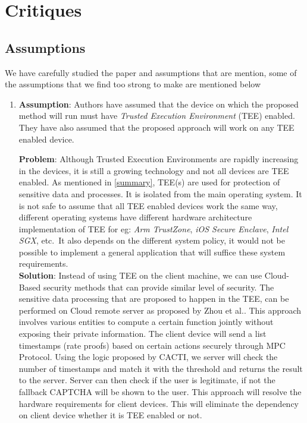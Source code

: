 \documentclass[runningheads,10pt]{llncs}
\begin{document}
	\section{Critiques}

	\subsection{Assumptions  \label{sec1}}

	We have carefully studied the paper and assumptions that are mention, some of the assumptions that we find too strong to make are mentioned below

	\begin{enumerate}
		\item \textbf{Assumption}: Authors have assumed that the device on which the proposed method will run must have \textit{Trusted Execution Environment} (TEE) enabled. They have also assumed that the proposed approach will work on any TEE enabled device.

		\textbf{Problem}: Although Trusted Execution Environments are rapidly increasing in the devices, it is still a growing technology and not all devices are TEE enabled. As mentioned in \ref{summary}, TEE(s) are used for protection of sensitive data and processes. It is isolated from the main operating system. It is not safe to assume that all TEE enabled devices work the same way, different operating systems have different hardware architecture implementation of TEE for eg: \textit{Arm TrustZone}, \textit{iOS Secure Enclave}, \textit{Intel SGX}, etc.\ It also depends on the different system policy, it would not be possible to implement a general application that will suffice these system requirements.\\

		\textbf{Solution}: Instead of using TEE on the client machine, we can use Cloud-Based security methods that can provide similar level of security. The sensitive data processing that are proposed to happen in the TEE, can be performed on Cloud remote server as proposed by Zhou et al.\cite{ref1}. This approach involves various entities to compute a certain function jointly without exposing their private information. The client device will send a list timestamps (rate proofs) based on certain actions securely through MPC Protocol. Using the logic proposed by CACTI, we server will check the number of timestamps and match it with the threshold and returns the result to the server. Server can then check if the user is legitimate, if not the fallback CAPTCHA will be shown to the user. This approach will resolve the hardware requirements for client devices. This will eliminate the dependency on client device whether it is TEE enabled or not.\\


\end{enumerate}
\end{document}

